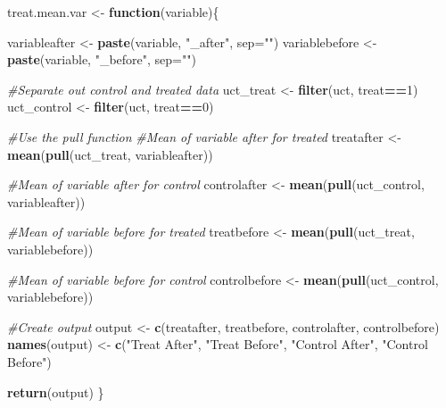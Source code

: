 \documentclass[
]{book}
\newenvironment{Shaded}{\begin{snugshade}}{\end{snugshade}}
\newcommand{\AttributeTok}[1]{\textcolor[rgb]{0.13,0.29,0.53}{#1}}
\newcommand{\CommentTok}[1]{\textcolor[rgb]{0.56,0.35,0.01}{\textit{#1}}}
\newcommand{\ControlFlowTok}[1]{\textcolor[rgb]{0.13,0.29,0.53}{\textbf{#1}}}
\newcommand{\DecValTok}[1]{\textcolor[rgb]{0.00,0.00,0.81}{#1}}
\newcommand{\FunctionTok}[1]{\textcolor[rgb]{0.13,0.29,0.53}{\textbf{#1}}}
\newcommand{\NormalTok}[1]{#1}
\newcommand{\OtherTok}[1]{\textcolor[rgb]{0.56,0.35,0.01}{#1}}
\newcommand{\SpecialCharTok}[1]{\textcolor[rgb]{0.81,0.36,0.00}{\textbf{#1}}}
\newcommand{\StringTok}[1]{\textcolor[rgb]{0.31,0.60,0.02}{#1}}
\begin{document}
\begin{Shaded}
\begin{Highlighting}[]
\NormalTok{treat.mean.var }\OtherTok{\textless{}{-}} \ControlFlowTok{function}\NormalTok{(variable)\{}
  
\NormalTok{  variableafter }\OtherTok{\textless{}{-}} \FunctionTok{paste}\NormalTok{(variable, }\StringTok{"\_after"}\NormalTok{, }\AttributeTok{sep=}\StringTok{""}\NormalTok{)}
\NormalTok{  variablebefore }\OtherTok{\textless{}{-}} \FunctionTok{paste}\NormalTok{(variable, }\StringTok{"\_before"}\NormalTok{, }\AttributeTok{sep=}\StringTok{""}\NormalTok{)}
  
  \CommentTok{\#Separate out control and treated data}
\NormalTok{  uct\_treat }\OtherTok{\textless{}{-}} \FunctionTok{filter}\NormalTok{(uct, treat}\SpecialCharTok{==}\DecValTok{1}\NormalTok{)}
\NormalTok{  uct\_control }\OtherTok{\textless{}{-}} \FunctionTok{filter}\NormalTok{(uct, treat}\SpecialCharTok{==}\DecValTok{0}\NormalTok{)}
  
  \CommentTok{\#Use the pull function }
  \CommentTok{\#Mean of variable after for treated}
\NormalTok{  treatafter }\OtherTok{\textless{}{-}} \FunctionTok{mean}\NormalTok{(}\FunctionTok{pull}\NormalTok{(uct\_treat, variableafter))}
  
  \CommentTok{\#Mean of variable after for control}
\NormalTok{  controlafter }\OtherTok{\textless{}{-}} \FunctionTok{mean}\NormalTok{(}\FunctionTok{pull}\NormalTok{(uct\_control, variableafter))}
  
  \CommentTok{\#Mean of variable before for treated}
\NormalTok{  treatbefore }\OtherTok{\textless{}{-}} \FunctionTok{mean}\NormalTok{(}\FunctionTok{pull}\NormalTok{(uct\_treat, variablebefore))}
  
  \CommentTok{\#Mean of variable before for control}
\NormalTok{  controlbefore }\OtherTok{\textless{}{-}} \FunctionTok{mean}\NormalTok{(}\FunctionTok{pull}\NormalTok{(uct\_control, variablebefore))}
  
  \CommentTok{\#Create output}
\NormalTok{  output }\OtherTok{\textless{}{-}} \FunctionTok{c}\NormalTok{(treatafter, treatbefore, controlafter, }
\NormalTok{              controlbefore)}
  \FunctionTok{names}\NormalTok{(output) }\OtherTok{\textless{}{-}} \FunctionTok{c}\NormalTok{(}\StringTok{"Treat After"}\NormalTok{, }\StringTok{"Treat Before"}\NormalTok{, }
                     \StringTok{"Control After"}\NormalTok{, }\StringTok{"Control Before"}\NormalTok{)}
  
  \FunctionTok{return}\NormalTok{(output)}
\NormalTok{\}}
\end{Highlighting}
\end{Shaded}
\end{document}
